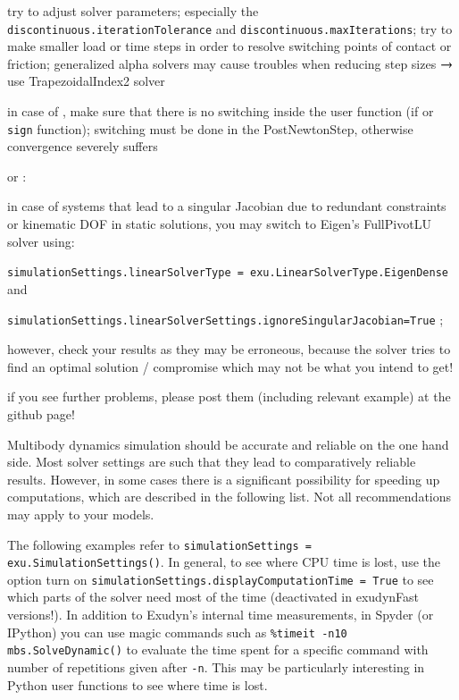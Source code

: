   \bi
  \item[$\ra$] try to adjust solver parameters; especially the \texttt{discontinuous.iterationTolerance} and \texttt{discontinuous.maxIterations}; try to make smaller load or time steps in order to resolve switching points of contact or friction; generalized alpha solvers may cause troubles when reducing step sizes $\ra$ use TrapezoidalIndex2 solver
  \item[$\ra$] in case of , make sure that there is no switching inside the user function (if or \texttt{sign} function); switching must be done in the PostNewtonStep, otherwise convergence severely suffers
  \ei
  \item {} or :
  \bi
  \item[$\ra$] in case of systems that lead to a singular Jacobian due to redundant constraints or kinematic DOF in static solutions, you may switch to Eigen's FullPivotLU solver using:
  \item[$\ra$] \texttt{simulationSettings.linearSolverType = exu.LinearSolverType.EigenDense} and 
  \item[$\ra$] \texttt{simulationSettings.linearSolverSettings.ignoreSingularJacobian=True} ;
  \item[$\ra$] however, check your results as they may be erroneous, because the solver tries to find an optimal solution / compromise which may not be what you intend to get!
  \ei
  \item if you see further problems, please post them (including relevant example) at the \codeName github page!
\ei

%
Multibody dynamics simulation should be accurate and reliable on the one hand side. Most solver settings are such that they lead to comparatively reliable results.
However, in some cases there is a significant possibility for speeding up computations, which are described in the following list. Not all recommendations may apply to your models.

The following examples refer to \texttt{simulationSettings = exu.SimulationSettings()}.
In general, to see where CPU time is lost, use the option turn on \texttt{simulationSettings.displayComputationTime = True} to see which parts of the solver need most of the time (deactivated in exudynFast versions!).
In addition to Exudyn's internal time measurements, in Spyder (or IPython) you can use magic commands such as \texttt{\%timeit -n10 mbs.SolveDynamic()} to evaluate the time spent for a specific command with number of repetitions given after \texttt{-n}. This may be particularly interesting in Python user functions to see where time is lost.

